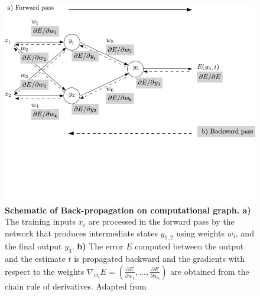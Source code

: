 
\begin{figure}[H]
    \centering
    \includegraphics[width=\textwidth]{figures/Intro/backpro.pdf}
    \caption{\textbf{Schematic of Back-propagation on computational graph. a)} The training inputs $x_i$ are processed 
    in the forward pass by the network that produces intermediate states $y_{1,2}$ using weights $w_i$, and the final 
    output $y_3$. \textbf{b)} The error $E$ computed between the output and the estimate $t$ is propagated backward 
    and the gradients with respect to the weights $\nabla_{w_i} E = (\frac{\partial{E}}{\partial{w_1}},..., \frac{\partial{E}}{\partial{w_6}})$
    are obtained from the chain rule of derivatives. Adapted from \cite{baydin2018}}
    \label{fig:sgd}
\end{figure}

\newpage

